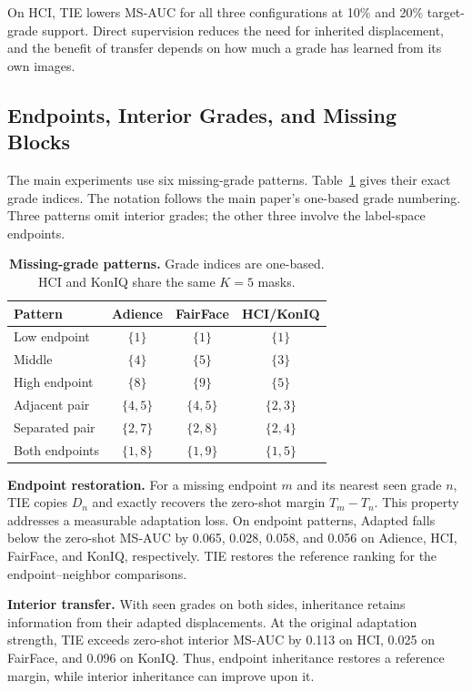 On HCI, TIE lowers MS-AUC for all three configurations at 10\% and 20\% target-grade support. Direct supervision reduces the need for inherited displacement, and the benefit of transfer depends on how much a grade has learned from its own images.

\subsection{Endpoints, Interior Grades, and Missing Blocks}
\label{sec:supp_missing_structure}

The main experiments use six missing-grade patterns. Table~\ref{tab:supp_missing_masks} gives their exact grade indices. The notation follows the main paper's one-based grade numbering. Three patterns omit interior grades; the other three involve the label-space endpoints.

\begin{table}[t]
\centering
\caption{\textbf{Missing-grade patterns.}
Grade indices are one-based. HCI and KonIQ share the same $K=5$ masks.}
\label{tab:supp_missing_masks}
\footnotesize
\setlength{\tabcolsep}{3pt}
\begin{tabular*}{\columnwidth}{@{\extracolsep{\fill}}lccc@{}}
\toprule
Pattern & Adience & FairFace & HCI/KonIQ \\
\midrule
Low endpoint & $\{1\}$ & $\{1\}$ & $\{1\}$ \\
Middle & $\{4\}$ & $\{5\}$ & $\{3\}$ \\
High endpoint & $\{8\}$ & $\{9\}$ & $\{5\}$ \\
Adjacent pair & $\{4,5\}$ & $\{4,5\}$ & $\{2,3\}$ \\
Separated pair & $\{2,7\}$ & $\{2,8\}$ & $\{2,4\}$ \\
Both endpoints & $\{1,8\}$ & $\{1,9\}$ & $\{1,5\}$ \\
\bottomrule
\end{tabular*}
\end{table}

\noindent\textbf{Endpoint restoration.}
For a missing endpoint $m$ and its nearest seen grade $n$, TIE copies $D_n$ and exactly recovers the zero-shot margin $T_m-T_n$. This property addresses a measurable adaptation loss. On endpoint patterns, Adapted falls below the zero-shot MS-AUC by 0.065, 0.028, 0.058, and 0.056 on Adience, HCI, FairFace, and KonIQ, respectively. TIE restores the reference ranking for the endpoint--neighbor comparisons.

\noindent\textbf{Interior transfer.}
With seen grades on both sides, inheritance retains information from their adapted displacements. At the original adaptation strength, TIE exceeds zero-shot interior MS-AUC by 0.113 on HCI, 0.025 on FairFace, and 0.096 on KonIQ. Thus, endpoint inheritance restores a reference margin, while interior inheritance can improve upon it.

